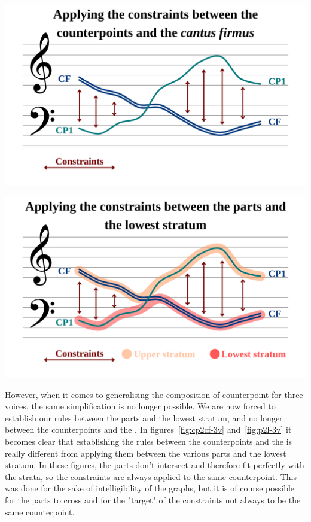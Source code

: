 \vspace{.5cm}
\begin{minipage}{0.46\textwidth}
    \centering
    \includegraphics[width=\textwidth]{Images/cp2cf-2v.png}
    \label{fig:cp2cf-2v}
    \end{minipage}
    \hfill
    \begin{minipage}{0.46\textwidth}
      \centering
      \includegraphics[width=\textwidth]{Images/p2l-2v.png}
      \label{fig:p2l-2v}
\end{minipage}
\vspace{.5cm}

However, when it comes to generalising the composition of counterpoint for three voices, the same simplification is no longer possible. We are now forced to establish our rules between the parts and the lowest stratum, and no longer between the counterpoints and the \cf. In figures~\ref{fig:cp2cf-3v} and~\ref{fig:p2l-3v} it becomes clear that establishing the rules between the counterpoints and the \cfs is really different from applying them between the various parts and the lowest stratum. In these figures, the parts don't intersect and therefore fit perfectly with the strata, so the constraints are always applied to the same counterpoint. This was done for the sake of intelligibility of the graphs, but it is of course possible for the parts to cross and for the "target" of the constraints not always to be the same counterpoint.

